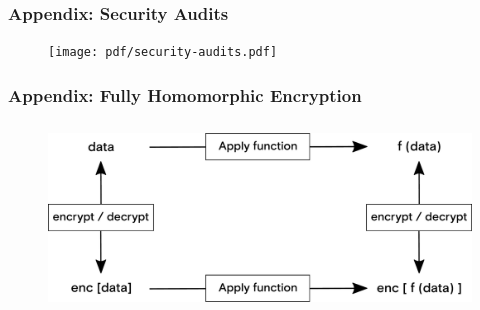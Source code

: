 \documentclass[xetex,mathsans,sans,aspectratio=169]{beamer}
\begin{document}
    \begin{frame}
        \frametitle{Appendix: Security Audits}
        \begin{figure}
            \centering
            \texttt{[image: pdf/security-audits.pdf]}
      \end{figure}
    \end{frame}

    \begin{frame}
      \frametitle{Appendix: Fully Homomorphic Encryption}
      \begin{figure}
        \centering
        \includegraphics[height=5cm]{pdf/fhe.pdf}
      \end{figure}
    \end{frame}
\end{document}
